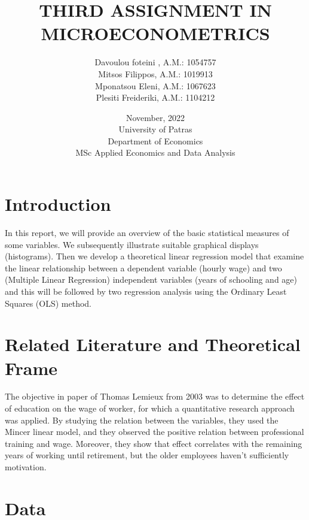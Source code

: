 \documentclass[10pt,towside,a4paper]{article}
\title{\textbf{THIRD ASSIGNMENT IN MICROECONOMETRICS}}
\author{Davoulou foteini , A.M.: 1054757 \\
	Mitsos Filippos, A.M.: 1019913\\
	Mponatsou Eleni, A.M.: 1067623 \\
	Plesiti Freideriki, A.M.: 1104212 }
\date{November, 2022\\
	University of Patras\\
	Department of Economics\\
	MSc Applied Economics and Data Analysis}
\begin{document}
\maketitle

\section{Introduction}
	
	\vspace {0.5\baselineskip}
	
	In this report, we will provide an overview of the basic statistical measures of some variables. We subsequently illustrate suitable graphical displays (histograms). Then we develop a theoretical linear regression model that examine the linear relationship between a dependent variable (hourly wage) and two (Multiple Linear Regression) independent variables (years of schooling and age) and this will be followed by two regression analysis using the Ordinary Least Squares (OLS) method. 
	
	\vspace {0.5\baselineskip}
	
\section{Related Literature and Theoretical Frame}
	
	\vspace {0.5\baselineskip}
	
	The objective in paper of Thomas Lemieux from 2003 was to determine the effect of education on the wage of worker, for which a quantitative research approach was applied. By studying the relation between the variables, they used the Mincer linear model, and they observed the positive relation between professional training and wage. Moreover, they show that effect correlates with the remaining years of working until retirement, but the older employees haven't sufficiently motivation.
	
	\vspace {0.5\baselineskip}
	
\section{Data}
	
	\vspace {0.5\baselineskip}
	
\end{document}
